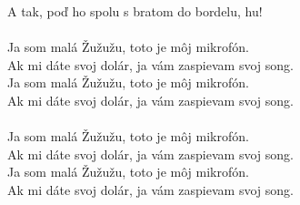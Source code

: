 A tak, poď ho spolu s bratom do bordelu, hu! \\
\\
Ja som malá Žužužu, toto je môj mikrofón. \\
Ak mi dáte svoj dolár, ja vám zaspievam svoj song.\\
Ja som malá Žužužu, toto je môj mikrofón. \\
Ak mi dáte svoj dolár, ja vám zaspievam svoj song.\\
\\
Ja som malá Žužužu, toto je môj mikrofón. \\
Ak mi dáte svoj dolár, ja vám zaspievam svoj song.\\
Ja som malá Žužužu, toto je môj mikrofón. \\
Ak mi dáte svoj dolár, ja vám zaspievam svoj song.\\